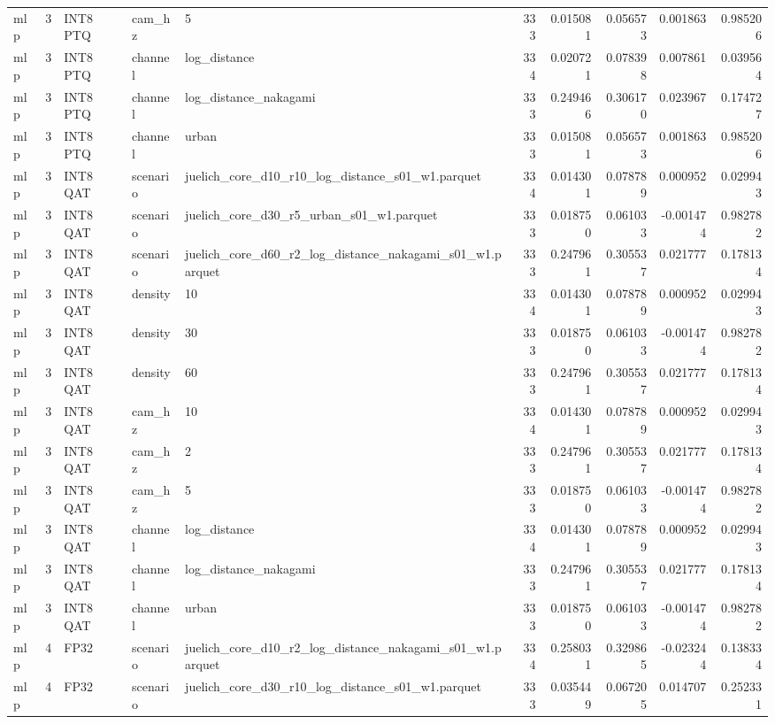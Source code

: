 \begin{tabular}{lrlllrrrrr}
mlp & 3 & INT8 PTQ & cam\_hz & 5 & 333 & 0.015081 & 0.056573 & 0.001863 & 0.985206 \\
mlp & 3 & INT8 PTQ & channel & log\_distance & 334 & 0.020721 & 0.078398 & 0.007861 & 0.039564 \\
mlp & 3 & INT8 PTQ & channel & log\_distance\_nakagami & 333 & 0.249466 & 0.306170 & 0.023967 & 0.174727 \\
mlp & 3 & INT8 PTQ & channel & urban & 333 & 0.015081 & 0.056573 & 0.001863 & 0.985206 \\
mlp & 3 & INT8 QAT & scenario & juelich\_core\_d10\_r10\_log\_distance\_s01\_w1.parquet & 334 & 0.014301 & 0.078789 & 0.000952 & 0.029943 \\
mlp & 3 & INT8 QAT & scenario & juelich\_core\_d30\_r5\_urban\_s01\_w1.parquet & 333 & 0.018750 & 0.061033 & -0.001474 & 0.982782 \\
mlp & 3 & INT8 QAT & scenario & juelich\_core\_d60\_r2\_log\_distance\_nakagami\_s01\_w1.parquet & 333 & 0.247961 & 0.305537 & 0.021777 & 0.178134 \\
mlp & 3 & INT8 QAT & density & 10 & 334 & 0.014301 & 0.078789 & 0.000952 & 0.029943 \\
mlp & 3 & INT8 QAT & density & 30 & 333 & 0.018750 & 0.061033 & -0.001474 & 0.982782 \\
mlp & 3 & INT8 QAT & density & 60 & 333 & 0.247961 & 0.305537 & 0.021777 & 0.178134 \\
mlp & 3 & INT8 QAT & cam\_hz & 10 & 334 & 0.014301 & 0.078789 & 0.000952 & 0.029943 \\
mlp & 3 & INT8 QAT & cam\_hz & 2 & 333 & 0.247961 & 0.305537 & 0.021777 & 0.178134 \\
mlp & 3 & INT8 QAT & cam\_hz & 5 & 333 & 0.018750 & 0.061033 & -0.001474 & 0.982782 \\
mlp & 3 & INT8 QAT & channel & log\_distance & 334 & 0.014301 & 0.078789 & 0.000952 & 0.029943 \\
mlp & 3 & INT8 QAT & channel & log\_distance\_nakagami & 333 & 0.247961 & 0.305537 & 0.021777 & 0.178134 \\
mlp & 3 & INT8 QAT & channel & urban & 333 & 0.018750 & 0.061033 & -0.001474 & 0.982782 \\
mlp & 4 & FP32 & scenario & juelich\_core\_d10\_r2\_log\_distance\_nakagami\_s01\_w1.parquet & 334 & 0.258031 & 0.329865 & -0.023244 & 0.138334 \\
mlp & 4 & FP32 & scenario & juelich\_core\_d30\_r10\_log\_distance\_s01\_w1.parquet & 333 & 0.035449 & 0.067205 & 0.014707 & 0.252331 \\

\end{tabular}
